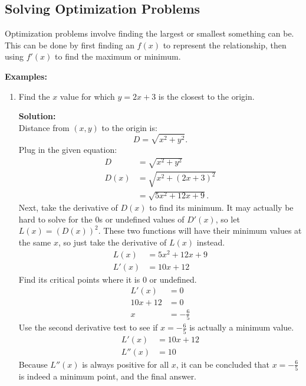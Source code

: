 \documentclass[12pt]{article}
\begin{document}
\subsection{Solving Optimization Problems}
Optimization problems involve finding the largest or smallest something can be. This can be done by first finding an $f(x)$ to represent the relationship, then using $f'(x)$ to find the maximum or minimum.

\noindent \textbf{Examples:}
\begin{enumerate}
    \item Find the $x$ value for which $y=2x+3$ is the closest to the origin.

          \noindent \textbf{Solution:}
          \\ Distance from $(x, y)$ to the origin is:
          \[ D = \sqrt{x^2 + y^2}. \]
          Plug in the given equation:
          \begin{align*}
              D    & = \sqrt{x^2 + y^2}       \\
              D(x) & = \sqrt{x^2 + (2x+3)^2}  \\
                   & = \sqrt{5x^2 + 12x + 9}.
          \end{align*}
          Next, take the derivative of $D(x)$ to find its minimum. It may actually be hard to solve for the $0$s or undefined values of $D'(x)$, so let $L(x) = \left( D(x) \right )^2$. These two functions will have their minimum values at the same $x$, so just take the derivative of $L(x)$ instead.
          \begin{align*}
              L(x)  & = 5x^2 + 12x + 9 \\
              L'(x) & = 10x + 12
          \end{align*}
          Find its critical points where it is $0$ or undefined.
          \begin{align*}
              L'(x)    & = 0            \\
              10x + 12 & = 0            \\
              x        & = -\frac{6}{5}
          \end{align*}
          Use the second derivative test to see if $x=-\frac{6}{5}$ is actually a minimum value.
          \begin{align*}
              L'(x)  & = 10x + 12 \\
              L''(x) & = 10
          \end{align*}
          Because $L''(x)$ is always positive for all $x$, it can be concluded that $x=-\frac{6}{5}$ is indeed a minimum point, and the final answer.


\end{enumerate}
\end{document}
